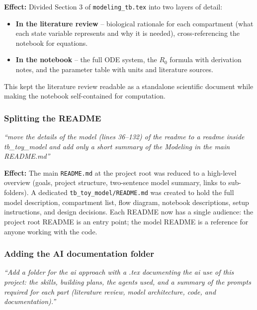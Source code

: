 \documentclass[11pt]{article}
\begin{document}
\noindent \textbf{Effect:} Divided Section 3 of \texttt{modeling\_tb.tex} into two layers of detail:
\begin{itemize}[noitemsep]
  \item \textbf{In the literature review} -- biological rationale for each compartment (what each state variable represents and why it is needed), cross-referencing the notebook for equations.
  \item \textbf{In the notebook} -- the full ODE system, the $R_0$ formula with derivation notes, and the parameter table with units and literature sources.
\end{itemize}
This kept the literature review readable as a standalone scientific document while making the notebook self-contained for computation.

\subsubsection{Splitting the README}

\begin{promptbox}
\textit{``move the details of the model (lines 36--132) of the readme to a readme inside tb\_toy\_model and add only a short summary of the Modeling in the main README.md''}
\end{promptbox}

\noindent \textbf{Effect:} The main \texttt{README.md} at the project root was reduced to a high-level overview (goals, project structure, two-sentence model summary, links to sub-folders). A dedicated \texttt{tb\_toy\_model/README.md} was created to hold the full model description, compartment list, flow diagram, notebook descriptions, setup instructions, and design decisions. Each README now has a single audience: the project root README is an entry point; the model README is a reference for anyone working with the code.

\subsubsection{Adding the AI documentation folder}

\begin{promptbox}
\textit{``Add a folder for the ai approach with a .tex documenting the ai use of this project: the skills, building plans, the agents used, and a summary of the prompts required for each part (literature review, model architecture, code, and documentation).''}
\end{promptbox}
\end{document}
